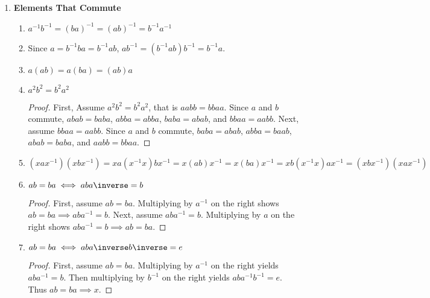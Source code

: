 \begin{enumerate}[label={\Alph*.},font={\bfseries}]
\begin{enumerate}[label={\arabic*},font={\bfseries}]
    As shown in the table, there does not exist an $x \in G$ such that $x = y^2$ for $y \in \Set{\mathbf{A}, \mathbf{C}, \mathbf{K}}$. \\
    Therefore $\neg\left(\forall x \in G,\ \exists y \in G\left( x = y^2 \right)\right)$.\qed
  \item
    \begin{align*}
      y &= xz \\
      x^{-1}y &= x^{-1}xz \\
      z &= x^{-1}y
    \end{align*}
    Therefore, for all $x,y \in G$, there exists a $z \in G$ such that $y = xz$.\qed
  \end{enumerate}
\newpage
\item {\bf Elements That Commute}
  \begin{enumerate}[label={\arabic*},font={\bfseries}]
  \item $a^{-1}b^{-1} = (ba)^{-1} = (ab)^{-1} = b^{-1}a^{-1}$
  \item Since $a = b^{-1}ba = b^{-1}ab$, $ab^{-1} = (b^{-1}ab)b^{-1} = b^{-1}a$.
  \item $a(ab) = a(ba) = (ab)a$
  \item $a^2b^2 = b^2a^2$
    \begin{proof}
      First, Assume $a^2b^2 = b^2a^2$, that is $aabb = bbaa$.
      Since $a$ and $b$ commute, $abab = baba$, $abba = abba$, $baba = abab$, and $bbaa = aabb$.
      Next, assume $bbaa = aabb$.
      Since $a$ and $b$ commute, $baba = abab$, $abba = baab$, $abab = baba$, and $aabb = bbaa$.
    \end{proof}
  \item $(xax^{-1})(xbx^{-1}) = xa(x^{-1}x)bx^{-1} = x(ab)x^{-1} = x(ba)x^{-1} = xb(x^{-1}x)ax^{-1} = (xbx^{-1})(xax^{-1})$
  \item $ab = ba \iff ab{a\inverse} = b$
    \begin{proof}
      First, assume $ab = ba$.
      Multiplying by $a^{-1}$ on the right shows $ab = ba \implies aba^{-1} = b$.
      Next, assume $aba^{-1} = b$.
      Multiplying by $a$ on the right shows $aba^{-1} = b \implies ab = ba$.
    \end{proof}
  \item $ab = ba \iff ab{a\inverse}{b\inverse} = e$
    \begin{proof}
      First, assume $ab = ba$.
      Multiplying by $a^{-1}$ on the right yields $aba^{-1} = b$.
      Then multiplying by $b^{-1}$ on the right yields $aba^{-1}b^{-1} = e$.
      Thus $ab = ba \implies x$.

\end{proof}
\end{enumerate}
\end{enumerate}

